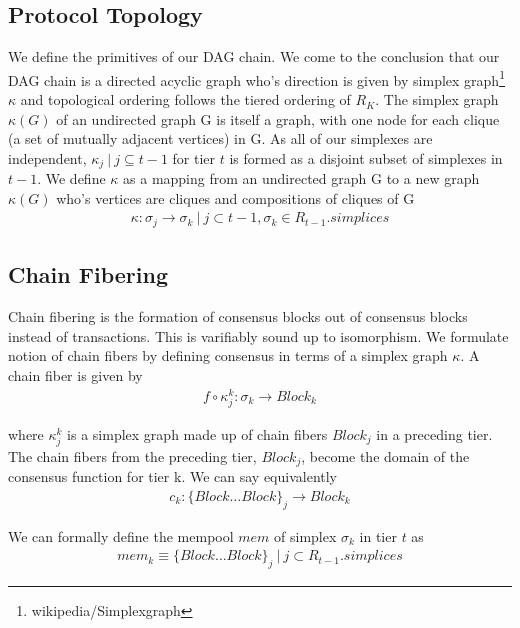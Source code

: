 \documentclass{article}
\begin{document}
\subsection{Protocol Topology}
We define the primitives of our DAG chain. We come to the conclusion that our DAG chain is a directed acyclic graph who's direction is given by simplex graph\footnote{wikipedia/Simplexgraph} $\kappa$ and topological ordering follows the tiered ordering of $R_K$. The simplex graph $\kappa(G)$ of an undirected graph G is itself a graph, with one node for each clique (a set of mutually adjacent vertices) in G. As all of our simplexes are independent, $\kappa_j \ | \ j \subseteq t-1$ for tier $t$ is formed as a disjoint subset of simplexes in $t-1$. We define $\kappa$ as a mapping from an undirected graph G to a new graph $\kappa(G)$ who's vertices are cliques and compositions of cliques of G
\begin{equation} \label{eq1}
\begin{split}
\kappa: \sigma_j \rightarrow \sigma_k \ | \ j \subset t-1, \sigma_k \in R_{t-1}.simplices
\end{split}
\end{equation}

\subsection{Chain Fibering}
Chain fibering is the formation of consensus blocks out of consensus blocks instead of transactions. This is varifiably sound up to isomorphism. We formulate notion of chain fibers by defining consensus in terms of a simplex graph $\kappa$. A chain fiber is given by 
\begin{equation} \label{eq1}
\begin{split}
f \circ \kappa_j^{k}: \sigma_k  \rightarrow Block_k
\end{split}
\end{equation}

where $\kappa_j^{k}$ is a simplex graph made up of chain fibers $Block_j$ in a preceding tier. The chain fibers from the preceding tier, $Block_j$, become the domain of the consensus function for tier k. We can say equivalently
\begin{equation} \label{eq1}
\begin{split}
c_k: \{Block \dots Block\}_j \rightarrow Block_k
\end{split}
\end{equation}

We can formally define the mempool $mem$ of simplex $\sigma_k$ in tier $t$ as 
\begin{equation} \label{eq1}
\begin{split}
mem_k \equiv \{Block \dots Block\}_j \ | \ j \subset R_{t-1}.simplices
\end{split}
\end{equation}
\end{document}
